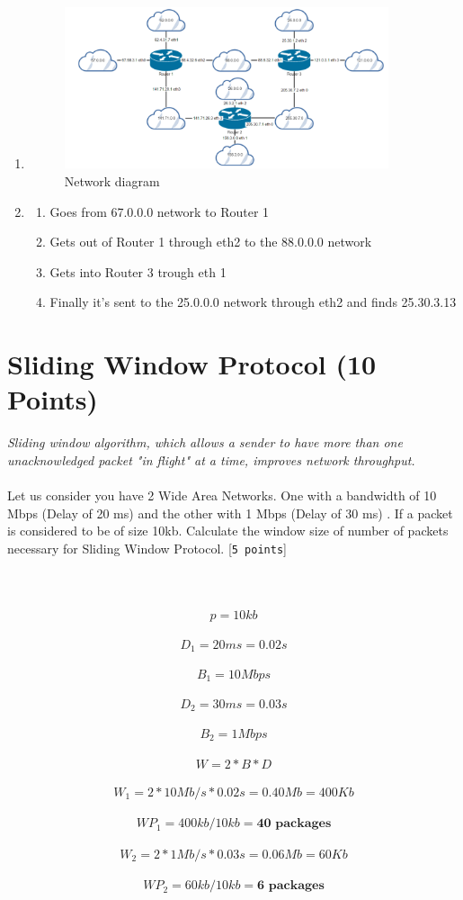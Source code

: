 \documentclass{WeSTassignment}
\begin{document}
\begin{enumerate}
\item
	\begin{figure}[!hb]
  	\centering
  	\includegraphics[width=0.9\textwidth]{network_diagram_1.png}
   	\caption{Network diagram}
     \label{fig:network diagram}
	\end{figure}
\item 
	\begin{enumerate}
	\item Goes from 67.0.0.0 network to Router 1
	\item Gets out of Router 1 through eth2 to the 88.0.0.0 network
	\item Gets into Router 3 trough eth 1
	\item Finally it's sent to the 25.0.0.0 network through eth2 and finds 25.30.3.13
	\end{enumerate}
\end{enumerate}



\section{Sliding Window Protocol (10 Points)}
\emph{Sliding window algorithm, which allows a sender to have more than one unacknowledged packet "in flight" at a time, improves network throughput. }\\ \\
Let us consider you have 2 Wide Area Networks. One with a bandwidth of 10 Mbps (Delay of 20 ms) and the other with 1 Mbps (Delay of 30 ms) . If a packet is considered to be of size 10kb. Calculate the window size of number of packets necessary for Sliding Window Protocol. [\texttt{5 points}]\\ \\
\\ \\
\[p   = 10kb\]\\
\[D_1= 20ms = 0.02s\]\\
\[B_1 = 10Mbps\]\\
\[D_2= 30ms = 0.03s\]\\
\[B_2 = 1Mbps\]\\
\[W = 2*B*D\]\\
\[W_1 = 2 * 10Mb/s * 0.02s = 0.40Mb = 400Kb\]\\
\[WP_1 = 400kb / 10kb = \textbf{40 packages}\]\\
\[W_2 = 2 * 1Mb/s * 0.03s = 0.06Mb = 60Kb\]\\
\[WP_2 = 60kb / 10kb = \textbf{6 packages}\] \\
\end{document}
